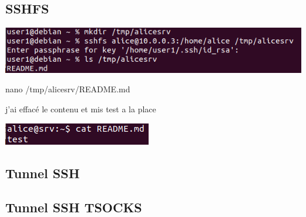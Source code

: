 \documentclass{article}
\begin{document}
 \subsection*{\normalsize{SSHFS} } 
 
 \begin{center}
        \includegraphics[scale=0.5]{Images/sshfs.png}
 \end{center}
 
 nano /tmp/alicesrv/README.md \par
 j’ai effacé le contenu et mis test a la place
 
 
  \begin{center}
        \includegraphics[scale=0.5]{Images/sshfsresult.png}
 \end{center}
 
 
 
 \subsection{\large{Tunnel SSH}}
 
 
 
 \subsection{\large{Tunnel SSH TSOCKS}}
 
 
 
\end{document}
